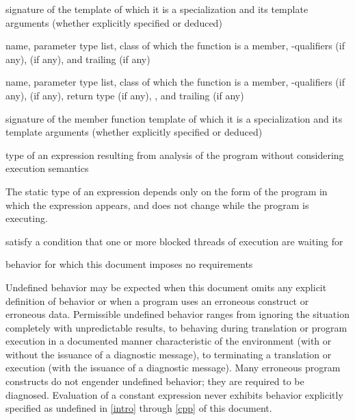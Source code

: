 %
 signature of the template of which it is a specialization
and its template arguments (whether explicitly specified or deduced)

%
name,
parameter type list,
class of which the function is a member,
\cv-qualifiers (if any),
 (if any),
and
trailing  (if any)

%
name,
parameter type list,
class of which the function is a member,
\cv-qualifiers (if any),
 (if any),
return type (if any),
,
and
trailing  (if any)

%
 signature of the member function template
of which it is a specialization and its template arguments (whether explicitly specified or deduced)

%
type of an expression resulting from
analysis of the program without considering execution semantics

\begin{defnote}
The static type of an expression depends only on the form of the program in
which the expression appears, and does not change while the program is
executing.
\end{defnote}

%
satisfy a condition that one or more blocked threads of execution are waiting for

%
behavior for which this document
imposes no requirements

\begin{defnote}
Undefined behavior may be expected when
this document omits any explicit
definition of behavior or when a program uses an erroneous construct or erroneous data.
Permissible undefined behavior ranges
from ignoring the situation completely with unpredictable results, to
behaving during translation or program execution in a documented manner
characteristic of the environment (with or without the issuance of a
diagnostic message), to terminating a translation or execution (with the
issuance of a diagnostic message). Many erroneous program constructs do
not engender undefined behavior; they are required to be diagnosed.
Evaluation of a constant expression never exhibits behavior explicitly
specified as undefined in \ref{intro} through \ref{cpp} of this document.
\end{defnote}


